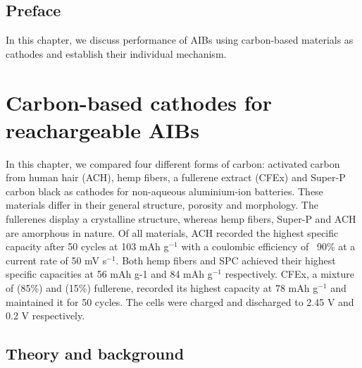 \section*{Preface}
In this chapter, we discuss performance of AIBs using carbon-based materials as cathodes and establish their individual mechanism.
\pagebreak
\chapter{Carbon-based cathodes for reachargeable AIBs} %

\label{chap5} %

In this chapter, we compared four different forms of carbon: activated carbon from human hair (ACH), hemp fibers, a fullerene extract (CFEx) and Super-P carbon black as cathodes for non-aqueous aluminium-ion batteries. These materials differ in their general structure, porosity and morphology. The fullerenes display a crystalline structure, whereas hemp fibers, Super-P and ACH are amorphous in nature. Of all materials, ACH recorded the highest specific capacity after 50 cycles at 103 mAh g$^{-1}$ with a coulombic efficiency of ~90\% at a current rate of 50 mV s$^{-1}$. Both hemp fibers and SPC achieved their highest specific capacities at 56 mAh g-1 and 84 mAh g$^{-1}$ respectively. CFEx, a mixture of  (85\%) and  (15\%) fullerene, recorded its highest capacity at 78 mAh g$^{-1}$ and maintained it for 50 cycles. The cells were charged and discharged to 2.45 V and 0.2 V respectively. \section{Theory and background}
